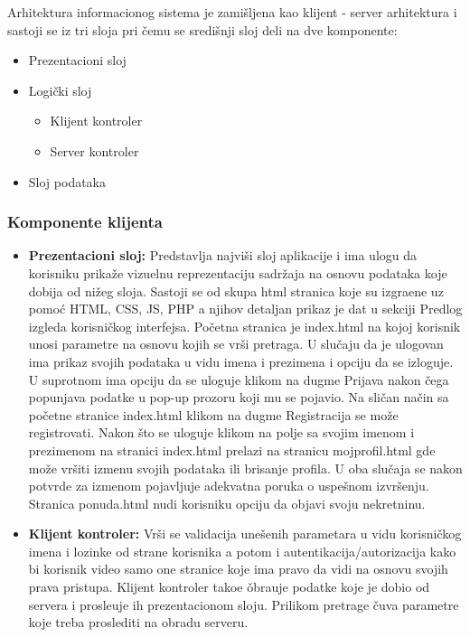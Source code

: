 \documentclass[20pt]{article}
\begin{document}
 Arhitektura informacionog sistema je zami\v {s}ljena kao klijent - server arhitektura i sastoji se iz tri sloja pri \v {c}emu se sredi\v {s}nji sloj deli na dve komponente: 
 \begin{itemize}
    \item Prezentacioni sloj
    \item Logi\v {c}ki sloj
    \begin{itemize}
        \item Klijent kontroler 
        \item Server kontroler
    \end{itemize}
    \item Sloj podataka
\end{itemize}
 
 
\subsubsection{\bfseries \Large Komponente klijenta }
\setlength{\parindent}{1cm}
\fontsize{13}{18} \selectfont 
\begin{itemize}
    \item \textbf{Prezentacioni sloj:} Predstavlja najvi\v {s}i sloj aplikacije i ima ulogu da korisniku prika\v {z}e vizuelnu reprezentaciju sadr\v {z}aja na osnovu podataka koje dobija od ni\v {z}eg sloja. Sastoji se od skupa html stranica koje su izgra\dj ene uz pomo\' c HTML, CSS, JS, PHP a njihov detaljan prikaz je dat u sekciji Predlog izgleda korisni\v {c}kog interfejsa. Po\v {c}etna stranica je index.html na kojoj korisnik unosi parametre na osnovu kojih se vr\v {s}i pretraga. U slu\v {c}aju da je ulogovan ima prikaz svojih podataka u vidu imena i prezimena i opciju da se izloguje. U suprotnom ima opciju da se uloguje klikom na dugme Prijava nakon \v {c}ega popunjava podatke u pop-up prozoru koji mu se pojavio. Na sli\v {c}an na\v {c}in sa po\v {c}etne stranice index.html klikom na dugme Registracija se mo\v {z}e registrovati. Nakon \v {s}to se uloguje klikom na polje sa svojim imenom i prezimenom na stranici index.html prelazi na stranicu mojprofil.html gde mo\v {z}e vr\v {s}iti izmenu svojih podataka ili brisanje profila. U oba slu\v {c}aja se nakon potvrde za izmenom pojavljuje adekvatna poruka o uspe\v {s}nom izvr\v {s}enju. Stranica ponuda.html nudi korisniku opciju da objavi svoju nekretninu. 
    \item \textbf{Klijent kontroler:} Vr\v {s}i se validacija une\v {s}enih parametara u vidu korisni\v {c}kog imena i lozinke od strane korisnika a potom i autentikacija/autorizacija kako bi korisnik video samo one stranice koje ima pravo da vidi na osnovu svojih prava pristupa. Klijent kontroler tako\dj e \v obra\dj uje podatke koje je dobio od servera i prosle\dj uje ih prezentacionom sloju. Prilikom pretrage \v {c}uva parametre koje treba proslediti na obradu serveru.
\end{itemize}
      
\end{document}
